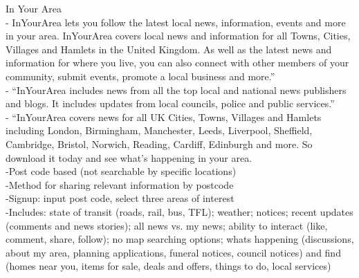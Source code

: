 In Your Area \\
-{\color{orange} InYourArea lets you follow the latest local news, information, events and more in your area. InYourArea covers local news and information for all Towns, Cities, Villages and Hamlets in the United Kingdom. As well as the latest news and information for where you live, you can also connect with other members of your community, submit events, promote a local business and more.”\cite{InYourArea}}\\
-{\color{orange} “InYourArea includes news from all the top local and national news publishers and blogs. It includes updates from local councils, police and public services.”\cite{InYourArea}}\\
-{\color{orange} “InYourArea covers news for all UK Cities, Towns, Villages and Hamlets including London, Birmingham, Manchester, Leeds, Liverpool, Sheffield, Cambridge, Bristol, Norwich, Reading, Cardiff, Edinburgh and more. So download it today and see what's happening in your area. \cite{InYourArea}}\\
-{\color{orange}Post code based (not searchable by specific locations)\cite{InYourArea}}\\
-{\color{orange}Method for sharing relevant information by postcode\cite{InYourArea}}\\
-{\color{orange}Signup: input post code, select three areas of interest\cite{InYourArea}}\\
-{\color{orange}Includes: state of transit (roads, rail, bus, TFL); weather; notices; recent updates (comments and news stories); all news vs. my news; ability to interact (like, comment, share, follow); no map searching options; whats happening (discussions, about my area, planning applications, funeral notices, council notices) and find (homes near you, items for sale, deals and offers, things to do, local services)\cite{InYourArea}}\\


